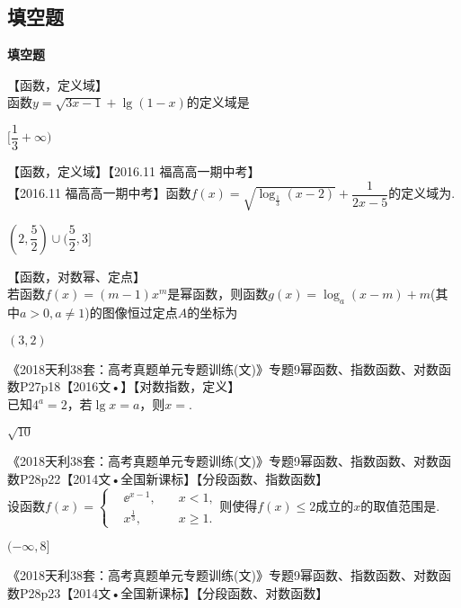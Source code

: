   \subsection{填空题}\begin{exercise}{\bf 填空题}
    \item 【函数，定义域】\\
       函数$y=\sqrt{3x-1}+\lg(1-x)$的定义域是\tk
      \begin{answer}
        $[\dfrac13 +\infty)$
      \end{answer}
    \item 【函数，定义域】【2016.11 福高高一期中考】\\
      【2016.11 福高高一期中考】函数$f(x)=\sqrt{\log_{\frac13}(x-2)}+\dfrac1{2x-5}$的定义域为\tk.
      \begin{answer}
        $(2,\dfrac52)\cup(\dfrac52,3] $
      \end{answer}
    \item 【函数，对数幂、定点】\\
       若函数$f(x)=(m-1)x^m$是幂函数，则函数$g(x)=\log_a(x-m)+m$(其中$a>0,a\neq 1$)的图像恒过定点$A$的坐标为\tk
       \begin{answer}
         $(3,2)$
       \end{answer}
    \item 《2018天利38套：高考真题单元专题训练(文)》专题9幂函数、指数函数、对数函数P27p18【2016文•】【对数指数，定义】\\
       已知$4^a=2$，若$\lg x=a$，则$x=$\tk.
       \begin{answer}
         $\sqrt{10}$
       \end{answer}
     \item 《2018天利38套：高考真题单元专题训练(文)》专题9幂函数、指数函数、对数函数P28p22【2014文•全国新课标】【分段函数、指数函数】\\
       设函数$f(x)=\left\{\begin{aligned}
       &\ee^{x-1},\quad &x<1,\\
       &x^{\frac13},\quad &x\geqslant1.
       \end{aligned}\right.$则使得$f(x)\leqslant2$成立的$x$的取值范围是\tk.
       \begin{answer}
         $(-\infty,8]$
       \end{answer}
     \item 《2018天利38套：高考真题单元专题训练(文)》专题9幂函数、指数函数、对数函数P28p23【2014文•全国新课标】【分段函数、对数函数】\\

\end{exercise}
